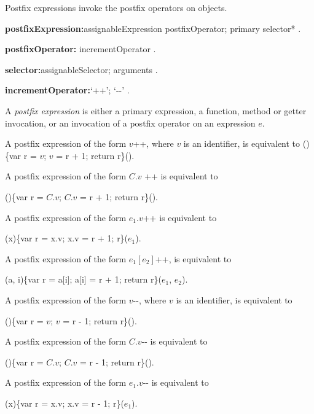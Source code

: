 \documentclass{article}
\newcommand{\code}[1]{{\sf #1}}
\begin{document}
\LMHash{}
Postfix expressions invoke the postfix operators on objects.

 \begin{grammar}
{\bf postfixExpression:}assignableExpression postfixOperator;
      primary selector*
    .

{\bf postfixOperator:}
      incrementOperator
    .

{\bf selector:}assignableSelector;
      arguments
    .

{\bf incrementOperator:}`++';
      `-{}-'
    .
        
 \end{grammar}
 
\LMHash{}
 A {\em postfix expression} is either a primary expression, a function, method or getter invocation, or an invocation of a postfix operator on an expression $e$.

\LMHash{}
A postfix expression of the form \code{$v$++}, where $v$ is an identifier, is equivalent to \code{()\{var r = $v$; $v$ = r + 1; return r\}()}.


\LMHash{}
A postfix expression of the form \code{$C.v$ ++} is equivalent to 

\code{()\{var r = $C.v$; $C.v$ = r + 1; return r\}()}.

\LMHash{}
A postfix expression of the form \code{$e_1.v$++} is equivalent to 

\code{(x)\{var r = x.v; x.v = r + 1; \RETURN{} r\}($e_1$)}.

\LMHash{}
A postfix expression of the form \code{$e_1[e_2]$++},  is equivalent to 

\code{(a, i)\{var r = a[i]; a[i] = r + 1; return r\}($e_1$, $e_2$)}.

\LMHash{}
A postfix expression of the form \code{$v$-{}-}, where $v$ is an identifier, is equivalent to 

\code{()\{var r = $v$; $v$ = r - 1; return r\}()}.

\LMHash{}
A postfix expression of the form \code{$C.v$-{}-} is equivalent to 

\code{()\{var r = $C.v$; $C.v$ = r - 1; return r\}()}.

\LMHash{}
A postfix expression of the form \code{$e_1.v$-{}-} is equivalent to 

\code{(x)\{var r = x.v; x.v = r - 1; \RETURN{} r\}($e_1$)}.
\end{document}
